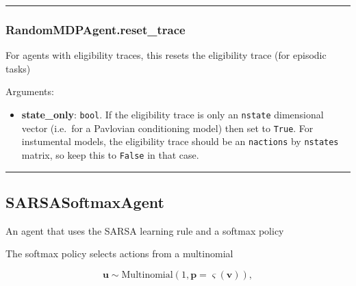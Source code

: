 \begin{center}\rule{0.5\linewidth}{\linethickness}\end{center}

\subsubsection{RandomMDPAgent.reset\_trace}\label{randommdpagent.reset_trace}

\begin{Shaded}
\begin{Highlighting}[]
\OperatorTok{=}\NormalTok{)}
\end{Highlighting}
\end{Shaded}

For agents with eligibility traces, this resets the eligibility trace
(for episodic tasks)

Arguments:

\begin{itemize}
\tightlist
\item
  \textbf{state\_only}: \texttt{bool}. If the eligibility trace is only
  an \texttt{nstate} dimensional vector (i.e.~for a Pavlovian
  conditioning model) then set to \texttt{True}. For instumental models,
  the eligibility trace should be an \texttt{nactions} by
  \texttt{nstates} matrix, so keep this to \texttt{False} in that case.
\end{itemize}

\begin{center}\rule{0.5\linewidth}{\linethickness}\end{center}

\subsection{SARSASoftmaxAgent}\label{sarsasoftmaxagent}

\begin{Shaded}
\begin{Highlighting}[]
\end{Highlighting}
\end{Shaded}

An agent that uses the SARSA learning rule and a softmax policy

The softmax policy selects actions from a multinomial

\[
\mathbf u \sim \mathrm{Multinomial}(1, \mathbf p=\varsigma(\mathbf v)),
\]

